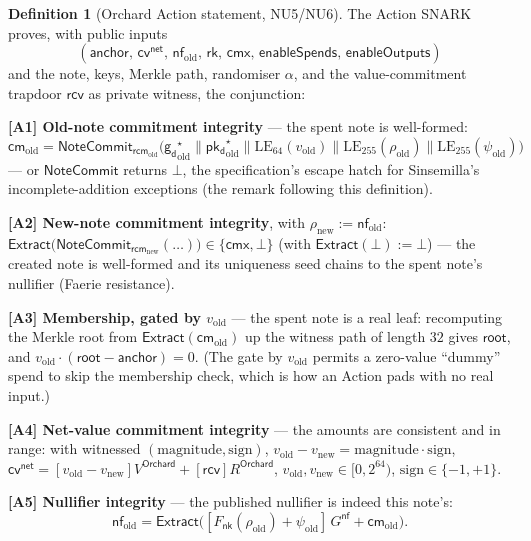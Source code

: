 \documentclass[11pt,a4paper]{article}
\theoremstyle{definition}
\newtheorem{definition}[theorem]{Definition}
\newcommand{\nfsym}{\mathsf{nf}}
\newcommand{\cmsym}{\mathsf{cm}}
\newcommand{\cmx}{\mathsf{cmx}}
\newcommand{\cvsym}{\mathsf{cv}}
\newcommand{\rk}{\mathsf{rk}}
\newcommand{\NoteCommit}{\ensuremath{\mathsf{NoteCommit}}}
\newcommand{\Extract}{\ensuremath{\mathsf{Extract}}}
\newcommand{\nksym}{\ensuremath{\mathsf{nk}}}
\newcommand{\pkd}{\ensuremath{\mathsf{pk_d}}}
\newcommand{\gd}{\ensuremath{\mathsf{g_d}}}
\newcommand{\rcv}{\ensuremath{\mathsf{rcv}}}
\newcommand{\rcm}{\ensuremath{\mathsf{rcm}}}
\begin{document}
\begin{definition}[Orchard Action statement, NU5/NU6]\label{def:action}
The Action SNARK proves, with public inputs
\[
(\mathsf{anchor},\, \cvsym^{\mathsf{net}},\, \nfsym_{\mathrm{old}},\, \rk,\, \cmx,\, \mathsf{enableSpends},\, \mathsf{enableOutputs})
\]
and the note, keys, Merkle path, randomiser $\alpha$, and the
value-commitment trapdoor $\rcv$ as private witness, the conjunction:

\medskip\noindent
\textbf{[A1] Old-note commitment integrity} --- the spent note is
well-formed:
\[
\cmsym_{\mathrm{old}} = \NoteCommit_{\rcm_{\mathrm{old}}}\!\bigl(\gd_{\mathrm{old}}^\star \| \pkd_{\mathrm{old}}^\star \| \mathrm{LE}_{64}(v_{\mathrm{old}}) \| \mathrm{LE}_{255}(\rho_{\mathrm{old}}) \| \mathrm{LE}_{255}(\psi_{\mathrm{old}})\bigr)
\]
--- or $\NoteCommit$ returns $\bot$, the specification's escape hatch for
Sinsemilla's incomplete-addition exceptions (the remark following this
definition).

\noindent
\textbf{[A2] New-note commitment integrity}, with $\rho_{\mathrm{new}} := \nfsym_{\mathrm{old}}$:
$\Extract\bigl(\NoteCommit_{\rcm_{\mathrm{new}}}(\ldots)\bigr) \in \{\cmx, \bot\}$
(with $\Extract(\bot) := \bot$) --- the created note is well-formed
and its uniqueness seed chains to the spent note's nullifier (Faerie resistance).

\noindent
\textbf{[A3] Membership, gated by $v_{\mathrm{old}}$} --- the spent note is
a real leaf: recomputing the Merkle root from $\Extract(\cmsym_{\mathrm{old}})$
up the witness path of length $32$ gives $\mathsf{root}$, and
$v_{\mathrm{old}} \cdot (\mathsf{root} - \mathsf{anchor}) = 0$. (The gate by
$v_{\mathrm{old}}$ permits a zero-value ``dummy'' spend to skip the membership
check, which is how an Action pads with no real input.)

\noindent
\textbf{[A4] Net-value commitment integrity} --- the amounts are consistent
and in range: with witnessed $(\mathrm{magnitude}, \mathrm{sign})$,
$v_{\mathrm{old}} - v_{\mathrm{new}} = \mathrm{magnitude} \cdot \mathrm{sign}$,
$\cvsym^{\mathsf{net}} = [v_{\mathrm{old}} - v_{\mathrm{new}}] V^{\mathsf{Orchard}} + [\rcv] R^{\mathsf{Orchard}}$,
$v_{\mathrm{old}}, v_{\mathrm{new}} \in [0, 2^{64})$, $\mathrm{sign} \in \{-1,+1\}$.

\noindent
\textbf{[A5] Nullifier integrity} --- the published nullifier is indeed this
note's:
\[
\nfsym_{\mathrm{old}} = \Extract\bigl([F_{\nksym}(\rho_{\mathrm{old}}) + \psi_{\mathrm{old}}]\, G^{\mathsf{nf}} + \cmsym_{\mathrm{old}}\bigr).
\]


\end{definition}
\end{document}
